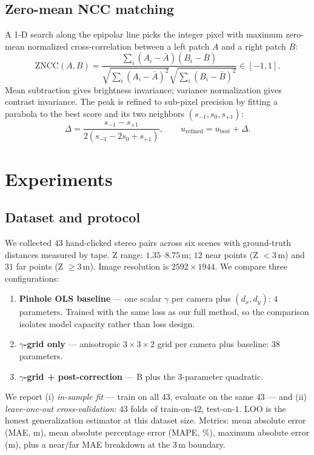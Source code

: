 \documentclass[11pt]{article}
\begin{document}
\subsection{Zero-mean NCC matching}

A 1-D search along the epipolar line picks the integer pixel with maximum zero-mean
normalized cross-correlation between a left patch $A$ and a right patch $B$:
\begin{equation}
\text{ZNCC}(A, B) = \frac{\sum_i (A_i - \bar A)(B_i - \bar B)}{\sqrt{\sum_i (A_i - \bar A)^2}\sqrt{\sum_i (B_i - \bar B)^2}} \in [-1, 1].
\end{equation}
Mean subtraction gives brightness invariance; variance normalization gives contrast
invariance. The peak is refined to sub-pixel precision by fitting a parabola to the best
score and its two neighbors $(s_{-1}, s_0, s_{+1})$:
\begin{equation}
\Delta = \frac{s_{-1} - s_{+1}}{2(s_{-1} - 2 s_0 + s_{+1})},
\qquad u_\text{refined} = u_\text{best} + \Delta.
\end{equation}

\section{Experiments}
\label{sec:exp}

\subsection{Dataset and protocol}

We collected $43$ hand-clicked stereo pairs across six scenes with ground-truth distances
measured by tape. Z range: $1.35$--$8.75$\,m; $12$ near points (Z $< 3$\,m) and $31$ far
points (Z $\geq 3$\,m). Image resolution is $2592 \times 1944$. We compare three
configurations:
\begin{enumerate}[leftmargin=2em]
  \item[\textbf{A.}] \textbf{Pinhole OLS baseline} --- one scalar $\gamma$ per camera plus
        $(d_x, d_y)$: $4$ parameters. Trained with the same loss as our full method, so
        the comparison isolates model capacity rather than loss design.
  \item[\textbf{B.}] \textbf{$\gamma$-grid only} --- anisotropic $3{\times}3{\times}2$ grid
        per camera plus baseline: $38$ parameters.
  \item[\textbf{C.}] \textbf{$\gamma$-grid + post-correction} --- B plus the 3-parameter
        quadratic.
\end{enumerate}
We report (i) \emph{in-sample fit} --- train on all $43$, evaluate on the same $43$ --- and
(ii) \emph{leave-one-out cross-validation}: $43$ folds of train-on-$42$, test-on-$1$. LOO
is the honest generalization estimator at this dataset size. Metrics: mean absolute error
(MAE, m), mean absolute percentage error (MAPE, \%), maximum absolute error (m), plus a
near/far MAE breakdown at the $3$\,m boundary.
\end{document}

